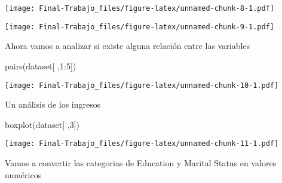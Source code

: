 \documentclass[Iberoamerican Journal of Industrial
Engineering,article,submit,moreauthors,pdftex]{Definitions/mdpi}
\newenvironment{Shaded}{\begin{snugshade}}{\end{snugshade}}
\newcommand{\AttributeTok}[1]{\textcolor[rgb]{0.77,0.63,0.00}{#1}}
\newcommand{\ConstantTok}[1]{\textcolor[rgb]{0.00,0.00,0.00}{#1}}
\newcommand{\DecValTok}[1]{\textcolor[rgb]{0.00,0.00,0.81}{#1}}
\newcommand{\FunctionTok}[1]{\textcolor[rgb]{0.00,0.00,0.00}{#1}}
\newcommand{\NormalTok}[1]{#1}
\newcommand{\OtherTok}[1]{\textcolor[rgb]{0.56,0.35,0.01}{#1}}
\newcommand{\SpecialCharTok}[1]{\textcolor[rgb]{0.00,0.00,0.00}{#1}}
\newcommand{\StringTok}[1]{\textcolor[rgb]{0.31,0.60,0.02}{#1}}
\begin{document}
\texttt{[image: Final-Trabajo\_files/figure-latex/unnamed-chunk-8-1.pdf]}

\begin{Shaded}
\end{Shaded}

\texttt{[image: Final-Trabajo\_files/figure-latex/unnamed-chunk-9-1.pdf]}

Ahora vamos a analizar si existe alguna relación entre las variables

\begin{Shaded}
\begin{Highlighting}[]
\FunctionTok{pairs}\NormalTok{(dataset[ ,}\DecValTok{1}\SpecialCharTok{:}\DecValTok{5}\NormalTok{])}
\end{Highlighting}
\end{Shaded}

\texttt{[image: Final-Trabajo\_files/figure-latex/unnamed-chunk-10-1.pdf]}

Un análisis de los ingresos

\begin{Shaded}
\begin{Highlighting}[]
\FunctionTok{boxplot}\NormalTok{(dataset[ ,}\DecValTok{3}\NormalTok{])}
\end{Highlighting}
\end{Shaded}

\texttt{[image: Final-Trabajo\_files/figure-latex/unnamed-chunk-11-1.pdf]}

Vamos a convertir las categorias de Education y Marital Status en
valores numéricos

\begin{Shaded}
\end{Shaded}
\end{document}
